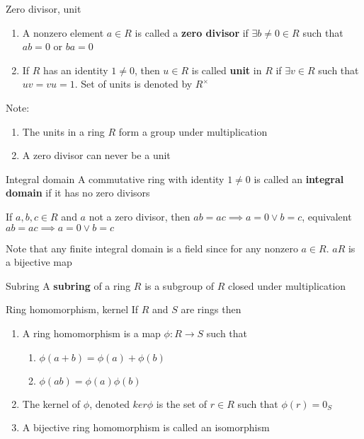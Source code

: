 \documentclass[titlepage, 12pt]{book}
\begin{document}
\begin{definition}{Zero divisor, unit}{}
    \begin{enumerate}
        \item A nonzero element $a\in R$ is called a \textbf{zero divisor} if
        $\exists b\neq 0\in R$ such that $ab=0$ or $ba=0$
        \item If $R$ has an identity $1\neq 0$, then $u\in R$ is called
        \textbf{unit} in $R$ if $\exists v\in R$ such that $uv=vu=1$. Set of
        units is denoted by $R^\times$
    \end{enumerate}
\end{definition}
 Note:
\begin{enumerate}
    \item The units in a ring $R$ form a group under multiplication
    \item A zero divisor can never be a unit
\end{enumerate}

\begin{definition}{Integral domain}{}
    A commutative ring with identity $1\neq 0$ is called an \textbf{integral
    domain} if it has no zero divisors
\end{definition}

\begin{proposition}{}{}
    If $a,b,c\in R$ and $a$ not a zero divisor, then $ab=ac\implies a = 0 \lor b =
    c$, equivalent $ab=ac\implies a = 0\lor b = c$
\end{proposition}

Note that any finite integral domain is a field since for any nonzero $a\in R$.
$aR$ is a bijective map

\begin{definition}{Subring}{}
    A \textbf{subring} of a ring $R$ is a subgroup of $R$ closed under
    multiplication
\end{definition}

\begin{definition}{Ring homomorphism, kernel}{}
    If $R$ and $S$ are rings then
    \begin{enumerate}
        \item A ring homomorphism is a map $\phi:R\rightarrow S$ such that
        \begin{enumerate}
            \item $\phi(a+b) = \phi(a) + \phi(b)$
            \item $\phi(ab) = \phi(a)\phi(b)$
        \end{enumerate}
        \item The kernel of $\phi$, denoted $ker\phi$ is the set of $r\in R$
            such that $\phi(r) = 0_S$
        \item A bijective ring homomorphism is called an isomorphism
    \end{enumerate}
\end{definition}
\end{document}
